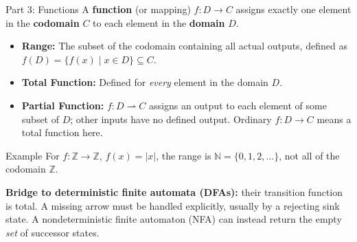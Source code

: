 \documentclass[10pt]{beamer}
\begin{document}
\begin{frame}{Part 3: Functions}
  \small
  A \textbf{function} (or mapping) $f : D \rightarrow C$ assigns exactly one element in the \textbf{codomain} $C$ to each element in the \textbf{domain} $D$.
  \pause
  \begin{itemize}
      \item \textbf{Range:} The subset of the codomain containing all actual outputs, defined as $f(D) = \{f(x) \mid x \in D\} \subseteq C$.
      \pause
      \item \textbf{Total Function:} Defined for \textit{every} element in the domain $D$.
      \pause
      \item \textbf{Partial Function:} $f:D\rightharpoonup C$ assigns an
        output to each element of some subset of $D$; other inputs have
        no defined output. Ordinary $f:D\to C$ means a total function here.
  \end{itemize}
  \pause
  \vspace{0.2cm}
  \begin{exampleblock}{Example}
    For $f:\mathbb{Z}\to\mathbb{Z}$, $f(x)=|x|$, the range is
    $\mathbb{N}=\{0,1,2,\ldots\}$, not all of the codomain $\mathbb{Z}$.
  \end{exampleblock}
  \textbf{Bridge to deterministic finite automata (DFAs):} their transition
  function is total. A missing arrow must be handled explicitly, usually
  by a rejecting sink state. A nondeterministic finite automaton (NFA)
  can instead return the empty \emph{set} of successor states.
\end{frame}
\end{document}
